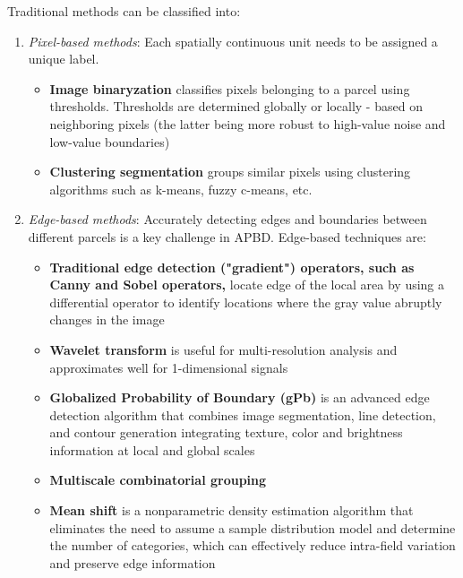 \documentclass{report}
\begin{document}
Traditional methods can be classified into:

\begin{enumerate}
  \item \emph{Pixel-based methods}: Each spatially continuous unit needs to be assigned a unique label.
  \begin{itemize}
    \item \textbf{Image binaryzation} classifies pixels belonging to a parcel using thresholds. Thresholds are determined globally
      or locally - based on neighboring pixels (the latter being more robust to high-value noise and low-value boundaries)
    \item \textbf{Clustering segmentation} groups similar pixels using clustering algorithms such as k-means, fuzzy c-means, etc.
  \end{itemize}

  \item \emph{Edge-based methods}: Accurately detecting edges and boundaries between different parcels is a key challenge in APBD.
    Edge-based techniques are:
    \begin{itemize}
      \item \textbf{Traditional edge detection ("gradient") operators, such as Canny and Sobel operators,} locate
        edge of the local area by using a differential operator
        to identify locations where the gray value abruptly changes in the image
      \item \textbf{Wavelet transform} is useful for multi-resolution analysis and approximates well
        for 1-dimensional signals
      \item \textbf{Globalized Probability of Boundary (gPb)} is an advanced edge detection algorithm 
        that combines image segmentation, line detection, and contour generation integrating
        texture, color and brightness information at local and global scales
      \item \textbf{Multiscale combinatorial grouping}
      \item \textbf{Mean shift} is a nonparametric density estimation algorithm that eliminates
       the need to assume a sample distribution model and determine the number of categories,
       which can effectively reduce intra-field variation and preserve edge information
    \end{itemize}


\end{enumerate}
\end{document}
